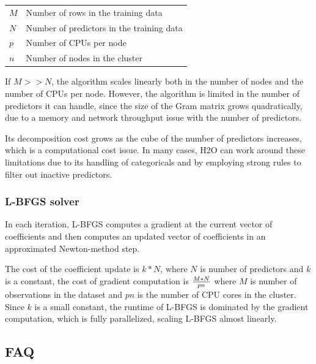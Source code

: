     \begin{tabular}{ l l }

    $M$ & Number of rows in the training data \\
    $N$ & Number of predictors in the training data \\
    $p$ & Number of CPUs per node \\
    $n$ & Number of nodes in the cluster \\
    \end{tabular}


If $M>>N$, the algorithm scales linearly both in the number of nodes and the number of CPUs per node. However,
the algorithm is limited in the number of predictors it can handle, since the size of the Gram matrix grows
quadratically, due to a memory and network throughput issue with the number of predictors. 

Its decomposition
cost grows as the cube of the number of predictors increases, which is a computational cost issue. In many cases, H2O can work around these limitations due to its handling of categoricals and by employing strong rules to filter out inactive predictors.

\subsubsection{L-BFGS solver}
In each iteration, L-BFGS computes a gradient at the current vector of coefficients and then computes an updated vector of coefficients in an approximated Newton-method step. 

The cost of the coefficient update is $k*N$, where $N$ is number of predictors and $k$ is a constant, the cost of gradient computation is $M*N\over pn$ where $M$ is number of observations in the dataset and $pn$ is the number of CPU cores in the cluster. Since $k$ is a small constant, the runtime of L-BFGS is dominated by the gradient computation, which is fully parallelized, scaling L-BFGS almost linearly. 

\subsection{FAQ}

